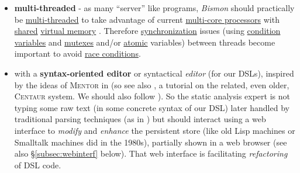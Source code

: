 \begin{itemize}
      \item \textbf{multi-threaded} - as many ``server'' like
        programs, \emph{Bismon} should practically be
        \href{https://en.wikipedia.org/wiki/Thread_(computing)}{multi-threaded}
          to take
        advantage of current
        \href{https://en.wikipedia.org/wiki/Multi-core\_processor}{multi-core
          processors}  with
        \href{https://en.wikipedia.org/wiki/Shared\_memory}{shared}
        \href{https://en.wikipedia.org/wiki/Virtual\_memory}{virtual
          memory} 
         . Therefore
        \href{https://en.wikipedia.org/wiki/Synchronization}{synchronization}
        issues (using
        \href{https://computing.llnl.gov/tutorials/pthreads/#ConVarSignal}{condition
          variables}  and
        \href{https://computing.llnl.gov/tutorials/pthreads/#MutexLocking}{mutexes}
         and/or
        \href{https://en.wikipedia.org/wiki/Atomic\_semantics}{atomic}
        variables)  between threads become
        important to avoid 
        \href{https://en.wikipedia.org/wiki/Race\_condition}{race
          conditions}.

      \item with a \textbf{syntax-oriented editor} or syntactical
        \emph{editor} 
         (for our DSLs), inspired by the
        ideas of \textsc{Mentor} 
        in \cite{donzeaugouge:inria-mentor} (so see also
        \cite{Jacobs:1992:Centaur}, a tutorial on the related, even
        older, \textsc{Centaur}  system. We should also follow
        \cite{amershi:2019:guidelines-human-AI-interact}). So the
        static analysis expert 
         is not typing some raw text (in some
        concrete syntax of our  DSL) later handled by
        traditional parsing techniques (as in
        \cite{Aho:2006:DragonBook}) but should interact using a web
        interface to \emph{modify} and \emph{enhance} the persistent
        store (like old Lisp machines or Smalltalk machines did in the
        1980s), partially shown in a web browser (see also
        \S\ref{subsec:webinterf} below). That web interface is
        facilitating \emph{refactoring} of DSL code.
\end{itemize}

